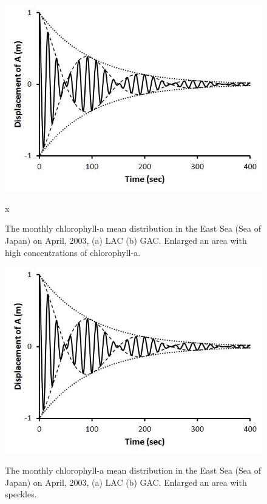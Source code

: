   \begin{figure}[h]
  	\centering
  	\includegraphics[width=0.8\linewidth]{../images/monHISHI}\\
  	\caption{The monthly chlorophyll-a mean distribution in the East Sea (Sea of Japan) on April, 2003, (a) LAC (b) GAC. Enlarged an area with high concentrations of chlorophyll-a.}
  	\label{fig:monHISHI}x
  \end{figure}
  
    \begin{figure}[h]
  	\centering
  	\includegraphics[width=0.8\linewidth]{../images/monHISSPEC}\\
  	\caption{The monthly chlorophyll-a mean distribution in the East Sea (Sea of Japan) on April, 2003, (a) LAC (b) GAC. Enlarged an area with speckles.}
  	\label{fig:monHISSPEC}
  \end{figure}
  
